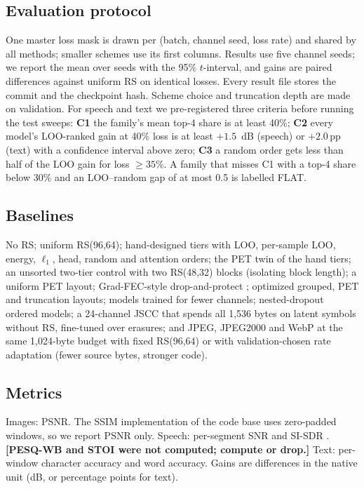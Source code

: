 \documentclass[journal]{IEEEtran}
\providecommand{\TBD}[1]{\textbf{\color{red}[#1]}}
\newcommand{\pp}{\,pp}
\begin{document}
\subsection{Evaluation protocol}
One master loss mask is drawn per (batch, channel seed, loss rate) and shared by all methods; smaller
schemes use its first columns. Results use five channel seeds; we report the mean over seeds with the
95\% $t$-interval, and gains are paired differences against uniform RS on identical losses. Every result
file stores the commit and the checkpoint hash. Scheme choice and truncation depth are made on
validation. For speech and text we pre-registered three criteria before running the test sweeps:
\textbf{C1} the family's mean top-4 share is at least 40\%; \textbf{C2} every model's LOO-ranked gain at
40\% loss is at least $+1.5$~dB (speech) or $+2.0$\pp{} (text) with a confidence interval above zero;
\textbf{C3} a random order gets less than half of the LOO gain for loss $\ge35\%$. A family that misses
C1 with a top-4 share below 30\% and an LOO--random gap of at most 0.5 is labelled FLAT.

\subsection{Baselines}
No RS; uniform RS(96,64); hand-designed tiers with LOO, per-sample LOO, energy, $\ell_1$, head, random and
attention orders; the PET twin of the hand tiers; an unsorted two-tier control with two RS(48,32) blocks
(isolating block length); a uniform PET layout; Grad-FEC-style drop-and-protect \cite{uyanik2023gradfec};
optimized grouped, PET and truncation layouts; models trained for fewer channels; nested-dropout ordered
models; a 24-channel JSCC that spends all 1,536 bytes on latent symbols without RS, fine-tuned over
erasures; and JPEG, JPEG2000 and WebP at the same 1,024-byte budget with fixed RS(96,64) or with
validation-chosen rate adaptation (fewer source bytes, stronger code).

\subsection{Metrics}
Images: PSNR. The SSIM implementation of the code base uses zero-padded windows, so we report PSNR only.
Speech: per-segment SNR and SI-SDR \cite{leroux2019sdr}. \TBD{PESQ-WB and STOI were not computed;
compute or drop.} Text: per-window character accuracy and word accuracy. Gains are differences in the
native unit (dB, or percentage points for text).
\end{document}
